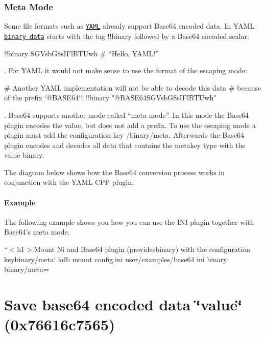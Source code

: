 \subsubsection*{Meta Mode}

Some file formats such as \href{http://yaml.org}{\tt Y\+A\+ML} already support Base64 encoded data. In Y\+A\+ML \href{http://yaml.org/type/binary.html}{\tt binary data} starts with the tag {\ttfamily !!binary} followed by a Base64 encoded scalar\+:


\begin{DoxyCode}
!!binary SGVsbG8sIFlBTUwh # “Hello, YAML!”
\end{DoxyCode}


. For Y\+A\+ML it would not make sense to use the format of the escaping mode\+:


\begin{DoxyCode}
# Another YAML implementation will not be able to decode this data
# because of the prefix `@BASE64`!
!!binary "@BASE64SGVsbG8sIFlBTUwh"
\end{DoxyCode}


. Base64 supports another mode called “meta mode”. In this mode the Base64 plugin encodes the value, but does not add a prefix. To use the escaping mode a plugin must add the configuration key {\ttfamily /binary/meta}. Afterwards the Base64 plugin encodes and decodes all data that contains the metakey {\ttfamily type} with the value {\ttfamily binary}.

The diagram below shows how the Base64 conversion process works in conjunction with the Y\+A\+ML C\+PP plugin.



\paragraph*{Example}

The following example shows you how you can use the I\+NI plugin together with Base64’s meta mode.

``{\ttfamily  $<$h1$>$Mount Ni and Base64 plugin (provides}binary{\ttfamily ) with the configuration key}binary/meta` kdb mount config.\+ini user/examples/base64 ini binary binary/meta=

\section*{Save base64 encoded data {\ttfamily \char`\"{}value\char`\"{}} ({\ttfamily 0x76616c7565})}


